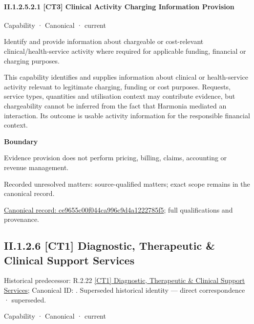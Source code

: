 \paragraph*{II.1.2.5.2.1 [CT3] Clinical Activity Charging Information Provision}
\label{navigation:II.1.2.5.2.1}

\label{element:ce9655c00f044ca996c9d4a1222785f5}
{\small Capability · Canonical · current}\par

Identify and provide information about chargeable or cost-relevant clinical/health-service activity where required for applicable funding, financial or charging purposes.



This capability identifies and supplies information about clinical or health-service activity relevant to legitimate charging, funding or cost purposes. Requests, service types, quantities and utilisation context may contribute evidence, but chargeability cannot be inferred from the fact that Harmonia mediated an interaction. Its outcome is usable activity information for the responsible financial context.



\textbf{Boundary}



Evidence provision does not perform pricing, billing, claims, accounting or revenue management.


{\small Recorded unresolved matters: source-qualified matters; exact scope remains in the canonical record.}\par
{\footnotesize \href{../../../../../../../continuum/strategy/capability/ce9655c00f044ca996c9d4a1222785f5.md}{Canonical record: ce9655c00f044ca996c9d4a1222785f5}; full qualifications and provenance.}\par
\subsection*{II.1.2.6 [CT1] Diagnostic, Therapeutic \& Clinical Support Services}
\label{navigation:II.1.2.6}

{\small Historical predecessor: R.2.22 \hyperref[element:e003b9cd0730459a84775d2837d1d173]{[CT1] Diagnostic, Therapeutic \& Clinical Support Services}; Canonical ID: \texttt{}. Superseded historical identity — direct correspondence · superseded.}\par
\label{element:4d98c3503a9f4890a677f09b0c3b6f82}
{\small Capability · Canonical · current}\par

